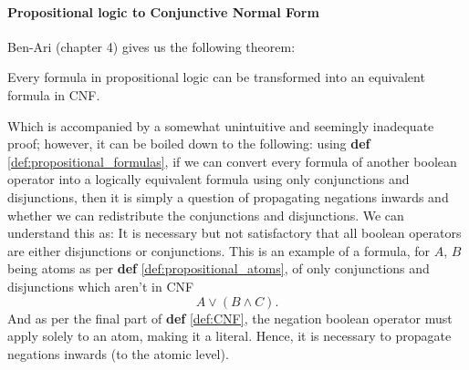 \paragraph{Propositional logic to Conjunctive Normal Form}
Ben-Ari (chapter 4)\cite{Math-Logic-for-CompSci} gives us the following theorem:
\begin{theorem}
    Every formula in propositional logic can be transformed into an equivalent formula in CNF.
\end{theorem}
Which is accompanied by a somewhat unintuitive and seemingly inadequate proof; however, it can be boiled down to the following: using \textbf{def} \ref{def:propositional_formulas}, if we can convert every formula of another boolean operator into a logically equivalent formula using only conjunctions and disjunctions, then it is simply a question of propagating negations inwards and whether we can redistribute the conjunctions and disjunctions. We can understand this as: It is necessary but not satisfactory that all boolean operators are either disjunctions or conjunctions. This is an example of a formula, for $A$, $B$ being atoms as per \textbf{def} \ref{def:propositional_atoms}, of only conjunctions and disjunctions which aren't in CNF
\begin{equation*}
    A \vee (B \wedge C).
\end{equation*}
And as per the final part of \textbf{def} \ref{def:CNF}, the negation boolean operator must apply solely to an atom, making it a literal. Hence, it is necessary to propagate negations inwards (to the atomic level).
